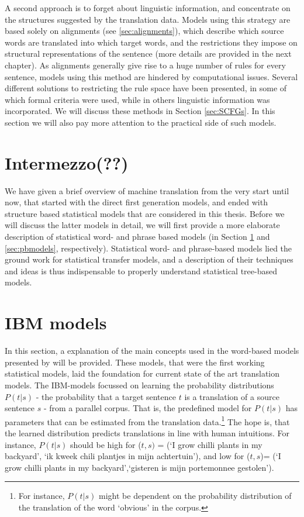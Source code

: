\documentclass{report}
\theoremstyle{break}
\begin{document}
A second approach is to forget about linguistic information, and concentrate on the structures suggested by the translation data. Models using this strategy are based solely on alignments (see \ref{sec:alignments}), which describe which source words are translated into which target words, and the restrictions they impose on structural representations of the sentence (more details are provided in the next chapter). As alignments generally give rise to a huge number of rules for every sentence, models using this method are hindered by computational issues. Several different solutions to restricting the rule space have been presented, in some of which formal criteria were used, while in others linguistic information was incorporated. We will discuss these methods in Section \ref{sec:SCFGs}. In this section we will also pay more attention to the practical side of such models.

\section*{Intermezzo(??)}
We have given a brief overview of machine translation from the very start until now, that started with the direct first generation models, and ended with structure based statistical models that are considered in this thesis. Before we will discuss the latter models in detail, we will first provide a more elaborate description of statistical word- and phrase based models (in Section \ref{sec:IBM} and \ref{sec:pbmodels}, respectively). Statistical word- and phrase-based models lied the ground work for statistical transfer models, and a description of their techniques and ideas is thus indispensable to properly understand statistical tree-based models.

\section{IBM models}
\label{sec:IBM}

In this section, a explanation of the main concepts used in the word-based models presented by \cite{brown1993mathematics} will be provided. These models, that were the first working statistical models, laid the foundation for current state of the art translation models. The IBM-models focussed on learning the probability distributions $P(t|s)$ - the probability that a target sentence $t$ is a translation of a source sentence $s$ - from a parallel corpus. That is, the predefined model for $P(t|s)$ has parameters that can be estimated from the translation data.\footnote{For instance, $P(t|s)$ might be dependent on the probability distribution of the translation of the word `obvious' in the corpus.} The hope is, that the learned distribution predicts translations in line with human intuitions. For instance, $P(t|s)$ should be high for ($t,s)$ = (`I grow chilli plants in my backyard', `ik kweek chili plantjes in mijn achtertuin'), and low for ($t,s$)= (`I grow chilli plants in my backyard',`gisteren is mijn portemonnee gestolen').
\end{document}
